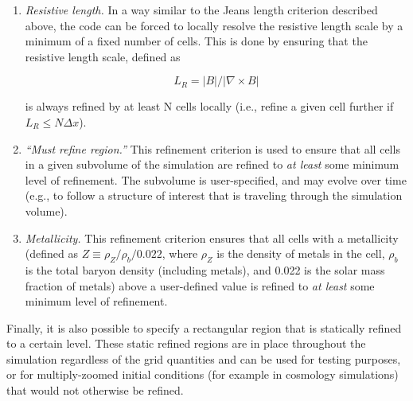 \begin{enumerate}
\item{\em Resistive length.}  In a way similar to the Jeans length criterion described above, the code can be forced to locally resolve the resistive length scale by a minimum of a fixed number of cells.  This is done by ensuring that the resistive length scale, defined as

\begin{equation}
L_R = |B| / |\nabla \times B|
\end{equation}

is always refined by at least N cells locally (i.e., refine a given cell further if $L_R \leq N \Delta x$).

\item{\em ``Must refine region.''}  This refinement criterion is used to ensure that all cells in a given subvolume of the simulation are refined to {\it at least} some minimum level of refinement.  The subvolume is user-specified, and may evolve over time (e.g., to follow a structure of interest that is traveling through the simulation volume).

\item{\em Metallicity.}  This refinement criterion ensures that all cells with a metallicity (defined as $Z \equiv \rho_{Z} / \rho_{b} / 0.022$, where $\rho_{Z}$ is the density of metals in the cell, $\rho_{b}$ is the total baryon density (including metals), and 0.022 is the solar mass fraction of metals) above a user-defined value is refined to {\it at least} some minimum level of refinement. 

\end{enumerate}

Finally, it is also possible to specify a rectangular region that is statically refined to a certain level.  These static refined regions are in place throughout the simulation regardless of the grid quantities and can be used for testing purposes, or for multiply-zoomed initial conditions (for example in cosmology simulations) that would not otherwise be refined.

%

